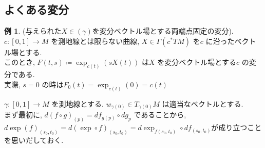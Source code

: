 \documentclass[twocolumn, landscape, a4paper , 8pt, fleqn, titlepage ]{jsarticle}
\theoremstyle{definition}
\newtheorem{ex}[dfn]{例}
\renewcommand{\-}{\hyphen}
\begin{document}
\subsection{よくある変分}

\begin{ex}(与えられた$X \in (\gamma)$を変分ベクトル場とする両端点固定の変分). \\
$c: [0,1] \rightarrow M$ を測地線とは限らない曲線, $X \in \Gamma(c^* TM)$ を$c$ に沿ったベクトル場とする. \\
このとき, $F(t,s) \coloneqq \exp_{c(t)} (s X(t))$ は$X$ を変分ベクトル場とする$c$ の変分である. \\
実際, $s = 0$ の時は$F_0 (t) = \exp_{c(t)} (0) = c(t)$ 
\end{ex}


$\gamma : [0,1] \rightarrow M$ を測地線とする. $w_{\gamma(0)} \in T_{\gamma(0)} M$ は適当なベクトルとする. \\まず最初に, 
$d(f \circ g)_(p) = df_{g(p)} \circ dg_{p}$ であることから, \\ $d{\exp(f)}_{(s_0,t_0)}= d(\exp \circ f )_{(s_0, t_0)} = d\exp_{f(s_0, t_0)} \circ df_{(s_0, t_0)} $が成り立つことを思いだしておく.
\end{document}
